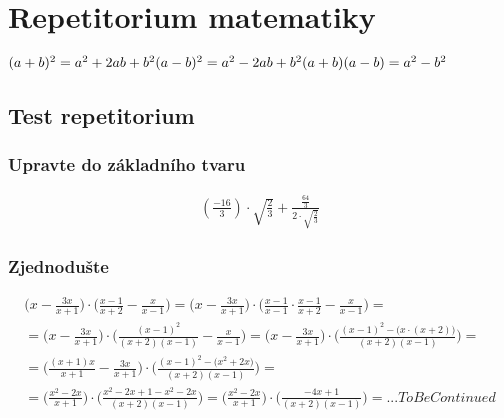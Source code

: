 

 \section*{Repetitorium matematiky}
\(
(a+b)^2 = a^2 +2ab + b^2 \\
(a-b)^2 = a^2 -2ab + b^2 \\
(a+b)(a-b) = a^2 - b^2
\)
\subsection*{Test repetitorium}
\subsubsection{Upravte do základního tvaru}
\begin{gather*}
    \left(
        \frac{-16}{3}
    \right) \cdot \sqrt{\frac{2}{3}} + \frac{\frac{64}{3}}{2\cdot\sqrt{\frac{2}{3}}}
\end{gather*}
\subsubsection*{Zjednodušte}
\begin{gather*}
    \biggl( x-\frac{3x}{x+1} \biggr)\cdot 
    \biggl( \frac{x-1}{x+2} - \frac{x}{x-1} \biggr) = 
    \biggl( x-\frac{3x}{x+1} \biggr)\cdot 
    \biggl(\frac{x-1}{x-1} \cdot \frac{x-1}{x+2} - \frac{x}{x-1} \biggr) = \\
     = \biggl( x-\frac{3x}{x+1} \biggr)\cdot 
    \biggl( \frac{(x-1)^2}{(x+2)(x-1)} - \frac{x}{x-1} \biggr) = 
    \biggl( x-\frac{3x}{x+1} \biggr)\cdot 
    \biggl( \frac{(x-1)^2 - \bigl(x \cdot (x+2)\bigr)}{(x+2)(x-1)}\biggr) =
    \\  
    = \biggl(\frac{(x+1)x}{x+1} -\frac{3x}{x+1} \biggr)\cdot 
    \biggl( \frac{(x-1)^2 - \bigl(x^2+2x\bigr)}{(x+2)(x-1)}\biggr) =
    \\
    = \biggl(
        \frac{x^2-2x}{x+1} 
    \biggr) \cdot 
    \biggl(
        \frac{x^2-2x+1-x^2-2x}{(x+2)(x-1)}
    \biggr) = \biggl(
        \frac{x^2-2x}{x+1}
    \biggr) \cdot \biggl(
        \frac{-4x+1}{(x+2)(x-1)}
    \biggr) = ... ToBeContinued
\end{gather*}
